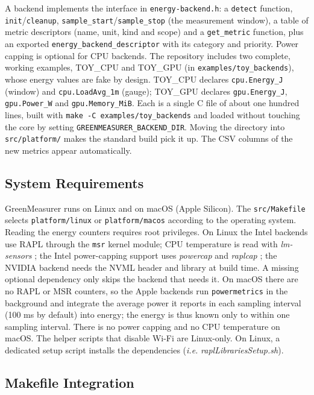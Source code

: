 A backend implements the interface in \texttt{energy-backend.h}: a \texttt{detect} function, \texttt{init}/\texttt{cleanup}, \texttt{sample\_start}/\texttt{sample\_stop} (the measurement window), a table of metric descriptors (name, unit, kind and scope) and a \texttt{get\_metric} function, plus an exported \texttt{energy\_backend\_descriptor} with its category and priority. Power capping is optional for CPU backends. The repository includes two complete, working examples, TOY\_CPU and TOY\_GPU (in \texttt{examples/toy\_backends}), whose energy values are fake by design. TOY\_CPU declares \texttt{cpu.Energy\_J} (window) and \texttt{cpu.LoadAvg\_1m} (gauge); TOY\_GPU declares \texttt{gpu.Energy\_J}, \texttt{gpu.Power\_W} and \texttt{gpu.Memory\_MiB}. Each is a single C file of about one hundred lines, built with \texttt{make -C examples/toy\_backends} and loaded without touching the core by setting \texttt{GREENMEASURER\_BACKEND\_DIR}. Moving the directory into \texttt{src/platform/} makes the standard build pick it up. The CSV columns of the new metrics appear automatically.

\subsection{System Requirements}

GreenMeasurer runs on Linux and on macOS (Apple Silicon). The \texttt{src/Makefile} selects \texttt{platform/linux} or \texttt{platform/macos} according to the operating system. Reading the energy counters requires root privileges. On Linux the Intel backends use RAPL through the \texttt{msr} kernel module; CPU temperature is read with \textit{lm-sensors} \cite{lm-sensors}; the Intel power-capping support uses \textit{powercap} \cite{powercap2025} and \textit{raplcap} \cite{raplcap}; the NVIDIA backend needs the NVML header and library at build time. A missing optional dependency only skips the backend that needs it. On macOS there are no RAPL or MSR counters, so the Apple backends run \texttt{powermetrics} in the background and integrate the average power it reports in each sampling interval (100 ms by default) into energy; the energy is thus known only to within one sampling interval. There is no power capping and no CPU temperature on macOS. The helper scripts that disable Wi-Fi are Linux-only. On Linux, a dedicated setup script installs the dependencies (\textit{i.e.} \textit{raplLibrariesSetup.sh}).

\subsection{Makefile Integration}

